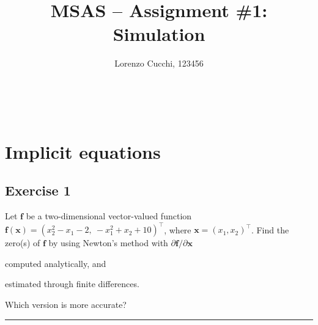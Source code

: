 \documentclass[11pt,a4paper,oneside]{article}
\title{MSAS -- Assignment \#1: Simulation} %
\author{\large {Lorenzo Cucchi}, {123456}}
\date{}
\makeatletter
\renewcommand{\vec}[1]{\mathbf{#1}}
\newcommand\headlinecolor{\normalcolor}
\renewcommand*\maketitle{%
    \begingroup
    \centering
    \fontsize{15}{15}%
    \selectfont
    \headlinecolor
    \@title\\
    \vspace{5mm}
    \@author
    \par
    \vskip1in
    \endgroup
    \vspace{-22mm}
}
\makeatother
\begin{document}
\maketitle

\thispagestyle{fancy}

\section{Implicit equations}

\subsection*{Exercise 1}

Let $\vec{f}$ be a two-dimensional vector-valued function $\vec{f}(\vec{x}) = (x_2^2-x_1-2, \ -x_1^2+x_2+10)^\top$, where $\vec{x} = (x_1, x_2)^\top$. Find the zero(s) of $\vec{f}$ by using Newton's method with $\partial\vec f/\partial\vec x$ 
\begin{enumerate*}[label=\arabic*)]
    \item computed analytically, and
    \item estimated through finite differences.
\end{enumerate*}
Which version is more accurate?

\medskip  \hrule \medskip
\end{document}
